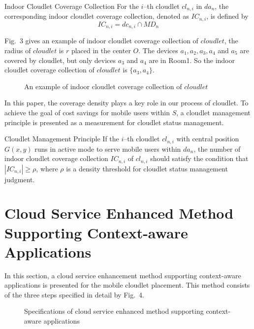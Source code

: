 \documentclass{llncs}
\begin{document}
\begin{definition}{Indoor Cloudlet Coverage Collection}
For the $i$--th cloudlet $cl_{n,i}$ in $da_n$, the corresponding indoor cloudlet coverage collection, denoted as $IC_{n,i}$, is defined by
\begin{equation}
  IC_{n,i} = dc_{n,i} \cap MD_n
\end{equation}
\end{definition}

Fig.~3 gives an example of indoor cloudlet coverage collection of $cloudlet$, the radius of $cloudlet$ is $r$ placed in the center $O$. The devices $a_1, a_2, a_3, a_4$ and $a_5$ are covered by cloudlet, but only devices $a_3$ and $a_4$ are in Room1. So the indoor cloudlet coverage collection of $cloudlet$ is $\{a_3, a_4\}$.

\begin{figure}
\centering
{}
\caption{An example of indoor cloudlet coverage collection of $cloudlet$}
\end{figure}

In this paper, the coverage density plays a key role in our process of cloudlet. To achieve the goal of cost savings for mobile users within $S$, a cloudlet management principle is presented as a measurement for cloudlet status management.

\begin{definition}{Cloudlet Management Principle}
If the $i$--th cloudlet $cl_{n,i}$ with central position $G(x, y)$ runs in active mode to serve mobile users within $da_n$, the number of indoor cloudlet coverage collection $IC_{n,i}$ of $cl_{n,i}$ should satisfy the condition that $\left|IC_{n,i}\right| \geq \rho$, where $\rho$ is a density threshold for cloudlet status management judgment.
\end{definition}
%
\section{Cloud Service Enhanced Method Supporting Context-aware Applications}
%
In this section, a cloud service enhancement method supporting context-aware applications is presented for the mobile cloudlet placement. This method consists of the three steps specified in detail by Fig.~4.

\begin{figure}
\centering
{}
\caption{Specifications of cloud service enhanced method supporting context-aware applications}
\end{figure}
%
\end{document}
